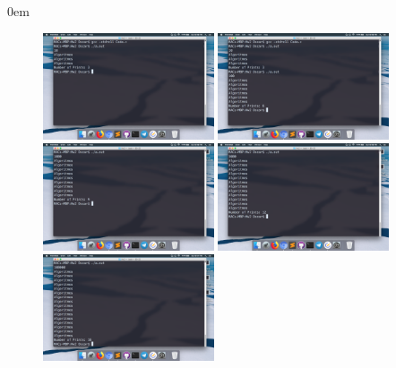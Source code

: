 \documentclass[12pt, fleqn]{article}                            %
\newenvironment{SmallIndentation}[1][0.75em]                    %
        {\begin{adjustwidth}{#1}{}\begin{footnotesize}}             %
        {\end{footnotesize}\end{adjustwidth}}                       %
\theoremstyle{break}                                            %
\begin{document}
\begin{SmallIndentation}[0em]
        \begin{figure}[h]
            \centering
            \includegraphics[width=0.45\textwidth]{6-1}
            \includegraphics[width=0.45\textwidth]{6-2}
            \includegraphics[width=0.45\textwidth]{6-3}
            \includegraphics[width=0.45\textwidth]{6-4}
            \includegraphics[width=0.45\textwidth]{6-5}
        \end{figure}

    \end{SmallIndentation}


    \clearpage
\end{document}
